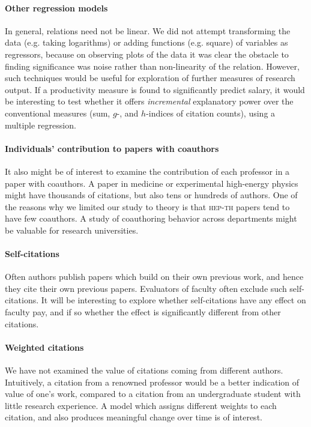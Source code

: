 \paragraph{Other regression models}
In general, relations need not be linear. We did not attempt transforming the data (e.g. taking logarithms) or adding functions (e.g. square) of variables as regressors, because on observing plots of the data it was clear the obstacle to finding significance was noise rather than non-linearity of the relation. However, such techniques would be useful for exploration of further measures of research output. If a productivity measure is found to significantly predict salary, it would be interesting to test whether it offers \emph{incremental} explanatory power over the conventional measures (sum, $g$-, and $h$-indices of citation counts), using a multiple regression.

\paragraph{Individuals' contribution to papers with coauthors}
It also might be of interest to examine the contribution of each professor in a paper with coauthors. A paper in medicine or experimental high-energy physics might have thousands of citations, but also tens or hundreds of authors. One of the reasons why we limited our study to theory is that \textsc{hep-th} papers tend to have few coauthors. A study of coauthoring behavior across departments might be valuable for research universities.

\paragraph{Self-citations}
Often authors publish papers which build on their own previous work, and hence they cite their own previous papers. Evaluators of faculty often exclude such self-citations. It will be interesting to explore whether self-citations have any effect on faculty pay, and if so whether the effect is significantly different from other citations.

\paragraph{Weighted citations}
We have not examined the value of citations coming from different authors. Intuitively, a citation from a renowned professor would be a better indication of value of one\textquoteright{}s work, compared to a citation from an undergraduate student with little research experience. A model which assigns different weights to each citation, and also produces meaningful change over time is of interest.

